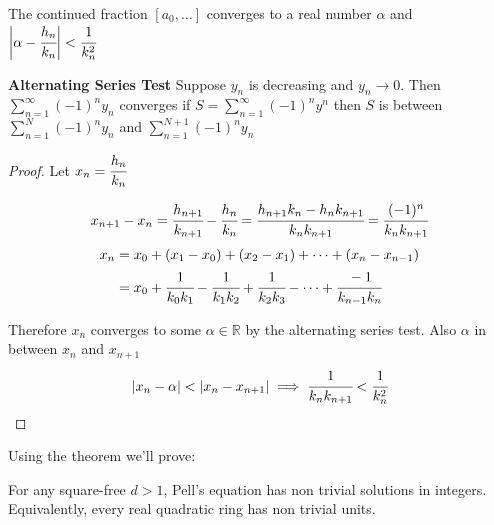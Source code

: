 \documentclass[11pt]{article}
\begin{document}
\begin{theorem}
	The continued fraction $[a_0, \dots]$ converges to a real number $\alpha$ and \\$\bigg | \alpha- \cfrac{h_n}{k_n} \bigg|< \cfrac{1}{k_n^2}$
\end{theorem}

\textbf{Alternating Series Test}
Suppose $y_n$ is decreasing and $y_n \rightarrow 0$. Then $\sum_{n=1}^{\infty} (-1)^n y_n$ converges if $S = \sum^{\infty}_{n=1} (-1)^ny^{n}$ then $S$ is between $\sum^{N}_{n=1}(-1)^ny_n $ and $\sum^{N+1}_{n=1}(-1)^ny_n$


\begin{proof}
	Let $x_n = \cfrac{h_n}{k_n}$

	\begin{align*}
		x_{n+1}-x_n = \cfrac{h_{n+1}}{k_{n+1}} -\cfrac{h_n}{k_n} = \cfrac{h_{n+1}k_n-h_nk_{n+1}}{k_nk_{n+1}} = \cfrac{(-1)^n}{k_n{k_{n+1}}} 
	\end{align*}
	\begin{align*}
		x_n &= x_0 + (x_1-x_0) + (x_2-x_1) + \dots + (x_n-x_{n-1})\\
		&= x_0 + \cfrac{1}{k_0k_1} - \cfrac{1}{k_1k_2} + \cfrac{1}{k_2k_3} -\dots + \cfrac{-1}{k_{n-1}k_n}
	\end{align*}

	Therefore $x_n$ converges to some $\alpha \in \mathbb{R} $ by the alternating series test. Also $\alpha $ in between $x_n$ and $x_{n+1}$
	\begin{align*}
		|x_n-\alpha| < |x_n-x_{n+1}| \implies \cfrac{1}{k_nk_{n+1}} < \cfrac{1}{k_n^2}
	\end{align*}
\end{proof}


Using the theorem we'll prove:

\begin{theorem}
For any square-free $d>1$, Pell's equation has non trivial solutions in integers. Equivalently, every real quadratic ring has non trivial units.
\end{theorem}
\end{document}
